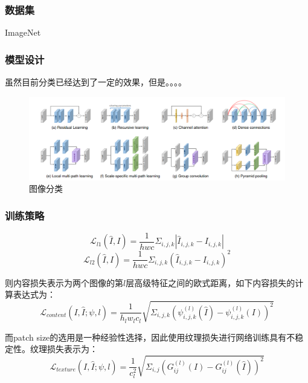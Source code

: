\documentclass[UTF8,a4paper,11pt]{ctexart}
\begin{document}
\begin{sloppypar}
	\subsubsection{数据集}
	ImageNet
	
	
	\subsubsection{模型设计}
	
	虽然目前分类已经达到了一定的效果，但是。。。。
	
	\begin{figure}[htbp]
		\centering
		\includegraphics[width=13cm]{./image/network.png}
		\caption{图像分类}
		\label{fig:label}
	\end{figure}
	
	\subsubsection{训练策略}
	
	\begin{equation}
		\mathcal{L}_{l1}(\hat{I}, I)=\frac{1}{hwc}\Sigma_{i,j,k}|\hat{I}_{i,j,k}-I_{i,j,k}| 
	\end{equation}
	\begin{equation}
		\mathcal{L}_{l2}(\hat{I}, I)=\frac{1}{hwc}\Sigma_{i,j,k}(\hat{I}_{i,j,k}-I_{i,j,k})^2
	\end{equation}

	则内容损失表示为两个图像的第$l$层高级特征之间的欧式距离，如下内容损失的计算表达式为：
	\begin{equation}
		\mathcal{L}_{content}(I,\hat{I};\psi,l)=\frac{1}{h_l w_l c_l}\sqrt{\Sigma_{i,j,k}(\psi_{i,j,k}^{(l)}(\hat{I})-\psi_{i,j,k}^{(l)}(I))^2}
	\end{equation}

	而patch size的选用是一种经验性选择，因此使用纹理损失进行网络训练具有不稳定性。纹理损失表示为：
	\begin{equation}
		\mathcal{L}_{texture}(I,\hat{I};\psi,l)=\frac{1}{c_l^2}\sqrt{\Sigma_{i,j}(G_{ij}^{(l)}(I)-G_{ij}^{(l)}(\hat{I}))^2}
	\end{equation}
	

\end{sloppypar}
\end{document}
